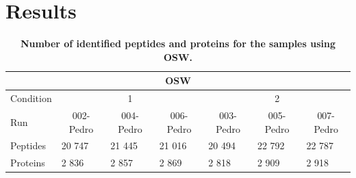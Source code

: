 \documentclass[10pt,letterpaper]{article}
\begin{document}

\section*{Results}


\begin{table}[H]
\begin{tabular}{lllllll}
\hline
\multicolumn{7}{c}{OSW}                                                                                                                                                                                   \\ \hline
Condition & \multicolumn{3}{c}{1}                                                                         & \multicolumn{3}{c}{2}                                                                         \\
Run       & \multicolumn{1}{c}{002-Pedro} & \multicolumn{1}{c}{004-Pedro} & \multicolumn{1}{c}{006-Pedro} & \multicolumn{1}{c}{003-Pedro} & \multicolumn{1}{c}{005-Pedro} & \multicolumn{1}{c}{007-Pedro} \\
Peptides  & 20 747                        & 21 445                        & 21 016                        & 20 494                        & 22 792                        & 22 787                        \\
Proteins  & 2 836                         & 2 857                         & 2 869                         & 2 818                         & 2 909                         & 2 918                         \\ \hline
\end{tabular}
 \caption{{\bf Number of identified peptides and proteins for the samples using OSW.}
      \label{fig:osw_peptide_and_protein_id}}
\end{table}
\end{document}
